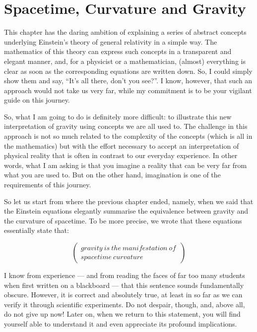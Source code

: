 \chapter{Spacetime, Curvature and Gravity}\label{ch:03}


This chapter has the daring ambition of explaining a series of abstract concepts
underlying Einstein's theory of general relativity in a simple way.
The mathematics of this theory can express such concepts in a transparent and elegant
manner, and, for a physicist or a mathematician, (almost) everything is clear as soon as
the corresponding equations are written down. So, I could simply show them and say,
``It's all there, don't you see?''. I know, however, that such an approach would not
take us very far, while my commitment is to be your vigilant guide on this journey.

So, what I am going to do is definitely more difficult: to illustrate this new
interpretation of gravity using concepts we are all used to. The challenge in this
approach is not so much related to the complexity of the concepts (which is all in the
mathematics) but with the effort necessary to accept an interpretation of physical
reality that is often in contrast to our everyday experience. In other words, what I am
asking is that you imagine a reality that can be very far from what you are used to. But
on the other hand, imagination is one of the requirements of this journey.

So let us start from where the previous chapter ended, namely, when we said that the
Einstein equations elegantly summarise the equivalence between gravity and the
curvature of spacetime. To be more precise, we wrote that these
equations essentially state that:

\begin{equation}\label{eq:03-01}
\begin{pmatrix}
gravity\ is\ the\ manifestation\ of\  \\
spacetime\ curvature
\end{pmatrix}
\end{equation}


I know from experience --- and from reading the faces of far too many students when
first written on a blackboard --- that this sentence sounds fundamentally obscure.
However, it is correct and absolutely true, at least in so far as we can verify it
through scientific experiments. Do not despair, though, and, above all, do not give up
now! Later on, when we return to this statement, you will find yourself able to
understand it and even appreciate its profound implications.

